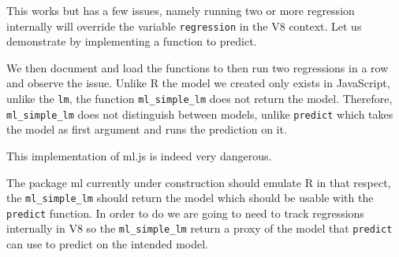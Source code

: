 \documentclass[
]{krantz}
\makeatletter
\newenvironment{Shaded}{\begin{snugshade}}{\end{snugshade}}
\newcommand{\CommentTok}[1]{\textcolor[rgb]{0.37,0.37,0.37}{\textit{#1}}}
\newcommand{\ControlFlowTok}[1]{\textcolor[rgb]{0.27,0.27,0.27}{\textbf{#1}}}
\newcommand{\DecValTok}[1]{\textcolor[rgb]{0.06,0.06,0.06}{#1}}
\newcommand{\KeywordTok}[1]{\textcolor[rgb]{0.27,0.27,0.27}{\textbf{#1}}}
\newcommand{\NormalTok}[1]{#1}
\newcommand{\OperatorTok}[1]{\textcolor[rgb]{0.43,0.43,0.43}{\textbf{#1}}}
\newcommand{\StringTok}[1]{\textcolor[rgb]{0.5,0.5,0.5}{#1}}
\newenvironment{kframe}{%
\medskip{}
\setlength{\fboxsep}{.8em}
 \def\at@end@of@kframe{}%
 \ifinner\ifhmode%
  \def\at@end@of@kframe{\end{minipage}}%
  \begin{minipage}{\columnwidth}%
 \fi\fi%
 \def\FrameCommand##1{\hskip\@totalleftmargin \hskip-\fboxsep
 \colorbox{shadecolor}{##1}\hskip-\fboxsep
     \hskip-\linewidth \hskip-\@totalleftmargin \hskip\columnwidth}%
 \MakeFramed {\advance\hsize-\width
   \@totalleftmargin\z@ \linewidth\hsize
   \@setminipage}}%
 {\par\unskip\endMakeFramed%
 \at@end@of@kframe}
\renewenvironment{Shaded}{\begin{kframe}}{\end{kframe}}
\makeatother
\begin{document}
This works but has a few issues, namely running two or more regression internally will override the variable \texttt{regression} in the V8 context. Let us demonstrate by implementing a function to predict.

\begin{Shaded}
\end{Shaded}

We then document and load the functions to then run two regressions in a row and observe the issue. Unlike R the model we created only exists in JavaScript, unlike the \texttt{lm}, the function \texttt{ml\_simple\_lm} does not return the model. Therefore, \texttt{ml\_simple\_lm} does not distinguish between models, unlike \texttt{predict} which takes the model as first argument and runs the prediction on it.

This implementation of ml.js is indeed very dangerous.

\begin{Shaded}
\end{Shaded}

The package ml currently under construction should emulate R in that respect, the \texttt{ml\_simple\_lm} should return the model which should be usable with the \texttt{predict} function. In order to do we are going to need to track regressions internally in V8 so the \texttt{ml\_simple\_lm} return a proxy of the model that \texttt{predict} can use to predict on the intended model.
\end{document}
